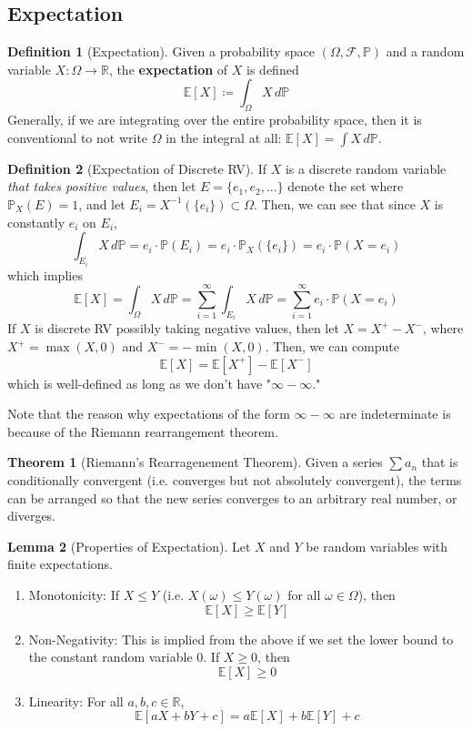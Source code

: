 \documentclass{article}
\theoremstyle{definition}
\newtheorem{theorem}{Theorem}[section]
\newtheorem{lemma}[theorem]{Lemma}
\theoremstyle{remark}
\theoremstyle{definition}
\newtheorem{definition}{Definition}[section]
\begin{document}
\subsection{Expectation}

\begin{definition}[Expectation]
Given a probability space $(\Omega, \mathcal{F}, \mathbb{P})$ and a random variable $X: \Omega \longrightarrow \mathbb{R}$, the \textbf{expectation} of $X$ is defined 
\[\mathbb{E}[X] \coloneqq \int_\Omega X \, d\mathbb{P}\]
Generally, if we are integrating over the entire probability space, then it is conventional to not write $\Omega$ in the integral at all: $\mathbb{E}[X] = \int X \,d\mathbb{P}$. 
\end{definition}

\begin{definition}[Expectation of Discrete RV]
If $X$ is a discrete random variable \textit{that takes positive values}, then let $E = \{e_1, e_2, \ldots\}$ denote the set where $\mathbb{P}_X(E) = 1$, and let $E_i = X^{-1} (\{e_i\}) \subset \Omega$. Then, we can see that since $X$ is constantly $e_i$ on $E_i$, 
\[\int_{E_i} X \, d\mathbb{P} = e_i \cdot \mathbb{P}(E_i) = e_i \cdot \mathbb{P}_X (\{e_i\}) = e_i \cdot \mathbb{P}(X = e_i)\]
which implies 
\[\mathbb{E}[X] = \int_\Omega X \, d\mathbb{P} = \sum_{i=1}^\infty \int_{E_i} X \, d\mathbb{P} = \sum_{i=1}^\infty e_i \cdot \mathbb{P}(X = e_i) \] 
If $X$ is discrete RV possibly taking negative values, then let $X = X^+ - X^-$, where $X^+ = \max(X, 0)$ and $X^- = - \min(X, 0)$. Then, we can compute 
\[\mathbb{E}[X] = \mathbb{E}[X^+] - \mathbb{E}[X^-]\]
which is well-defined as long as we don't have "$\infty - \infty$."
\end{definition}

Note that the reason why expectations of the form $\infty - \infty$ are indeterminate is because of the Riemann rearrangement theorem. 

\begin{theorem}[Riemann's Rearragenement Theorem]
Given a series $\sum a_n$ that is conditionally convergent (i.e. converges but not absolutely convergent), the terms can be arranged so that the new series converges to an arbitrary real number, or diverges. 
\end{theorem}

\begin{lemma}[Properties of Expectation]
Let $X$ and $Y$ be random variables with finite expectations. 
\begin{enumerate}
    \item Monotonicity: If $X \leq Y$ (i.e. $X(\omega) \leq Y(\omega)$ for all $\omega \in \Omega$), then 
    \[\mathbb{E}[X] \geq \mathbb{E}[Y]\]
    
    \item Non-Negativity: This is implied from the above if we set the lower bound to the constant random variable $0$. If $X \geq 0$, then 
    \[\mathbb{E}[X] \geq 0\]
    
    \item Linearity: For all $a, b, c \in \mathbb{R}$, 
    \[\mathbb{E}[a X + b Y + c] = a \mathbb{E}[X] + b \mathbb{E}[Y] + c\]
\end{enumerate}
\end{lemma}
\end{document}
